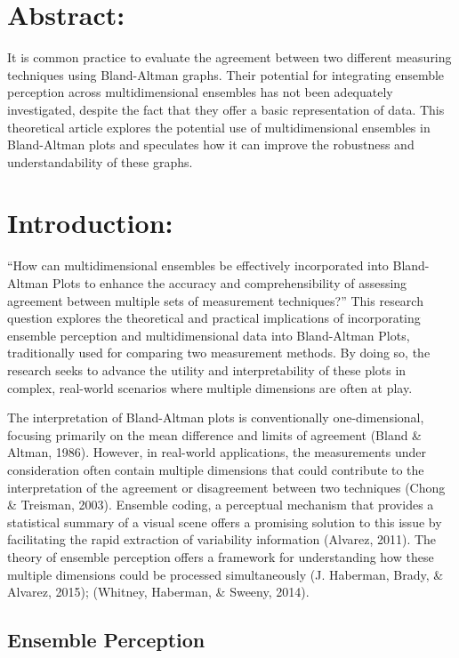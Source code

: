 \documentclass[print]{nuthesis}
\begin{document}
\hypertarget{abstract-2}{%
\section{Abstract:}\label{abstract-2}}

It is common practice to evaluate the agreement between two different measuring techniques using Bland-Altman graphs.
Their potential for integrating ensemble perception across multidimensional ensembles has not been adequately investigated, despite the fact that they offer a basic representation of data.
This theoretical article explores the potential use of multidimensional ensembles in Bland-Altman plots and speculates how it can improve the robustness and understandability of these graphs.

\hypertarget{introduction-3}{%
\section{Introduction:}\label{introduction-3}}

``How can multidimensional ensembles be effectively incorporated into Bland-Altman Plots to enhance the accuracy and comprehensibility of assessing agreement between multiple sets of measurement techniques?''
This research question explores the theoretical and practical implications of incorporating ensemble perception and multidimensional data into Bland-Altman Plots, traditionally used for comparing two measurement methods.
By doing so, the research seeks to advance the utility and interpretability of these plots in complex, real-world scenarios where multiple dimensions are often at play.

The interpretation of Bland-Altman plots is conventionally one-dimensional, focusing primarily on the mean difference and limits of agreement (Bland \& Altman, 1986).
However, in real-world applications, the measurements under consideration often contain multiple dimensions that could contribute to the interpretation of the agreement or disagreement between two techniques (Chong \& Treisman, 2003).
Ensemble coding, a perceptual mechanism that provides a statistical summary of a visual scene offers a promising solution to this issue by facilitating the rapid extraction of variability information (Alvarez, 2011).
The theory of ensemble perception offers a framework for understanding how these multiple dimensions could be processed simultaneously (J. Haberman, Brady, \& Alvarez, 2015); (Whitney, Haberman, \& Sweeny, 2014).

\hypertarget{ensemble-perception}{%
\subsection{Ensemble Perception}\label{ensemble-perception}}
\end{document}
